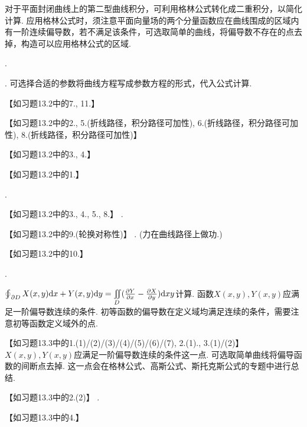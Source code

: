 \documentclass[12pt,UTF8]{ctexart}
\newcommand{\IInt}[3]{\iint\limits_{#1}#2\mathrm d#3}
\newcommand{\BLOInt}[2]{\varoint\nolimits_{#1}#2}
\newcommand{\ppx}[1]{\frac{\partial #1}{\partial x}}
\newcommand{\ppy}[1]{\frac{\partial #1}{\partial y}}
\begin{document}
对于平面封闭曲线上的第二型曲线积分，可利用格林公式转化成二重积分，以简化计算. 应用格林公式时，须注意平面向量场的两个分量函数应在曲线围成的区域内有一阶连续偏导数，若不满足该条件，可选取简单的曲线，将偏导数不存在的点去掉，构造可以应用格林公式的区域.
\begin{enumerate}
.
\begin{enumerate}
. 可选择合适的参数将曲线方程写成参数方程的形式，代入公式计算.

【如习题13.2中的7., 11.】
\begin{enumerate}

【如习题13.2中的2., 5.(折线路径，积分路径可加性), 6.(折线路径，积分路径可加性), 8.(折线路径，积分路径可加性)】

【如习题13.2中的3., 4.】

【如习题13.2中的1.】
\end{enumerate}
.

【如习题13.2中的3., 4., 5., 8.】
.

【如习题13.2中的9.(轮换对称性)】
. (力在曲线路径上做功.)

【如习题13.2中的10.】
\end{enumerate}
.
\begin{enumerate}
$\BLOInt{\partial D}{X(x,y)\mathrm dx+Y(x,y)\mathrm dy}=\IInt D{(\ppx Y-\ppy X)}xy$计算. 函数$X(x,y),Y(x,y)$应满足一阶偏导数连续的条件. 初等函数的偏导数在定义域均满足连续的条件，需要注意初等函数定义域外的点.

【如习题13.3中的1.(1)/(2)/(3)/(4)/(5)/(6)/(7), 2.(1)., 3.(1)/(2)】
$X(x,y),Y(x,y)$应满足一阶偏导数连续的条件这一点. 可选取简单曲线将偏导函数的间断点去掉. 这一点会在格林公式、高斯公式、斯托克斯公式的专题中进行总结.

【如习题13.3中的2.(2)】
.

【如习题13.3中的4.】
\end{enumerate}
\end{enumerate}
\end{document}
